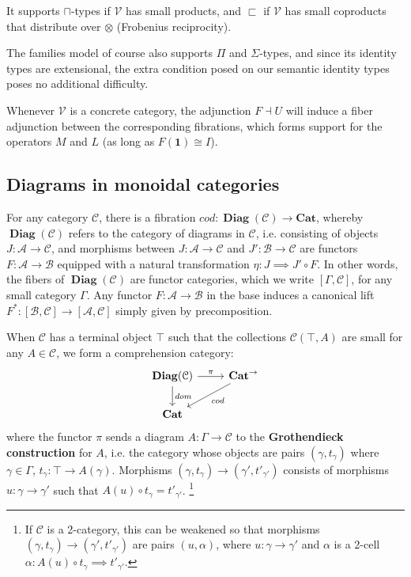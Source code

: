 \documentclass[a4paper,english]{lipics-v2018}
\DeclareMathOperator{\diag}{\mathbf{Diag}}
\begin{document}
It supports $\sqcap$-types if $\mathcal{V}$ has small products, and $\sqsubset$ if $\mathcal{V}$ has small coproducts that distribute over $\otimes$ (Frobenius reciprocity).

The families model of course also supports $\Pi$ and $\Sigma$-types, and since its identity types are extensional, the extra condition posed on our semantic identity types poses no additional difficulty.

Whenever $\mathcal{V}$ is a concrete category, the adjunction $F \dashv U$ will induce a fiber adjunction between the corresponding fibrations, which forms support for the operators $M$ and $L$ (as long as $F(\mathbf{1}) \cong I$).
\subsection{Diagrams in monoidal categories}
For any category $\mathcal{C}$, there is a fibration $cod : \diag(\mathcal{C}) \to \mathbf{Cat}$, whereby $\diag(\mathcal{C})$ refers to the category of diagrams in $\mathcal{C}$, i.e. consisting of objects $J : \mathcal{A} \to \mathcal{C}$, and morphisms between $J : \mathcal{A} \to \mathcal{C}$ and $J' :\mathcal{B} \to \mathcal{C}$ are functors $F : \mathcal{A} \to \mathcal{B}$ equipped with a natural transformation $\eta: J \implies J' \circ F$. In other words, the fibers of $\diag(\mathcal{C})$ are functor categories, which we write $[\Gamma, \mathcal{C}]$, for any small category $\Gamma$. Any functor $F : \mathcal{A} \to \mathcal{B}$ in the base induces a canonical lift $F^* : [\mathcal{B}, \mathcal{C}] \to [\mathcal{A},\mathcal{C}]$ simply given by precomposition.

When $\mathcal{C}$ has a terminal object $\top$ such that the collections $\mathcal{C}(\top, A)$ are small for any $A \in \mathcal{C}$, we form a comprehension category:
\[
\begin{tikzcd}
\diag(\mathcal{C}) \ar[d, "dom"] \ar[r,"\pi"] & \mathbf{Cat}^\to \ar[ld, "cod"] \\
\mathbf{Cat}
\end{tikzcd}
\]
where the functor $\pi$ sends a diagram $A : \Gamma \to \mathcal{C}$ to the \textbf{Grothendieck construction} for $A$, i.e. the category whose objects are pairs $(\gamma, t_\gamma)$ where $\gamma \in \Gamma$, $t_\gamma : \top \to A(\gamma)$. Morphisms $(\gamma, t_\gamma) \to (\gamma', t'_{\gamma'})$ consists of morphisms $u : \gamma \to \gamma'$ such that $ A(u) \circ t_\gamma = t'_{\gamma'}$. \footnote{If $\mathcal{C}$ is a 2-category, this can be weakened so that morphisms $(\gamma, t_\gamma) \to (\gamma', t'_{\gamma'})$ are pairs $(u, \alpha)$, where $u : \gamma \to \gamma'$ and $\alpha$ is a 2-cell $\alpha : A(u) \circ t_\gamma \implies t'_{\gamma'}$.}
\end{document}
